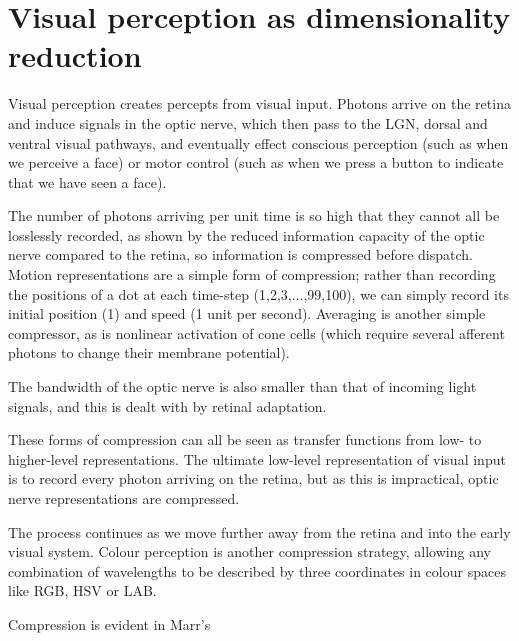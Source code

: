 \section{Visual perception as dimensionality reduction}

Visual perception creates percepts from visual input. Photons arrive on the retina and induce signals in the optic nerve, which then pass to the LGN, dorsal and ventral visual pathways, and eventually effect conscious perception (such as when we perceive a face) or motor control (such as when we press a button to indicate that we have seen a face).

The number of photons arriving per unit time is so high that they cannot all be losslessly recorded, as shown by the reduced information capacity of the optic nerve\cite{wolff1993computing} compared to the retina, so information is compressed before dispatch. Motion representations are a simple form of compression; rather than recording the positions of a dot at each time-step (1,2,3,...,99,100), we can simply record its initial position (1) and speed (1 unit per second). Averaging is another simple compressor, as is nonlinear activation of cone cells (which require several afferent photons to change their membrane potential).


The bandwidth of the optic nerve is also smaller than that of incoming light signals, and this is dealt with by retinal adaptation.


These forms of compression can all be seen as transfer functions from low- to higher-level representations. The ultimate low-level representation of visual input is to record every photon arriving on the retina, but as this is impractical, optic nerve representations are compressed.

The process continues as we move further away from the retina and into the early visual system. Colour perception is another compression strategy, allowing any combination of wavelengths to be described by three coordinates in colour spaces like RGB, HSV or LAB.

Compression is evident in Marr's 



